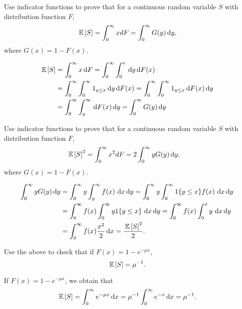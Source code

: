 \begin{question}
 Use indicator functions to prove that for  a continuous random
    variable $S$ with distribution function $F$, 
\begin{align*}
    \,\mathbb{E}\left[S\right] &= \int_0^\infty x dF  = \int_0^\infty G(y) \,\text{d}y,\\
\end{align*}
where $G(x) = 1 - F(x)$. 
\begin{solution}
\begin{equation*}
  \begin{split}
    \,\mathbb{E}\left[S\right] &= \int_0^\infty x \,\text{d}F  = \int_0^\infty \int_0^x \,\text{d}y \,\text{d}F(x) \\
    & = \int_0^\infty \int_0^\infty 1_{y\leq x} \,\text{d}y \,\text{d}F(x)   = \int_0^\infty \int_0^\infty 1_{y\leq x} \,\text{d}F(x) \,\text{d}y\\
    & = \int_0^\infty \int_y^\infty \,\text{d}F(x) \,\text{d}y = \int_0^\infty G(y) \,\text{d}y
  \end{split}
\end{equation*}
\end{solution}
\end{question}

\begin{question}
 Use indicator functions to prove that for  a continuous random
    variable $S$ with distribution function $F$, 
\begin{align*}
    \,\mathbb{E}\left[S\right]^2 &= \int_0^\infty x^2 dF  = 2 \int_0^\infty y G(y) \,\text{d}y,
\end{align*}
where $G(x) = 1 - F(x)$. 
\begin{solution}
  \begin{equation*}
    \begin{split}
\int_0^\infty y G(y) \,\text{d}y 
&=  \int_0^\infty y \int_y^\infty f(x)\, \,\text{d}x \,\text{d}y =  \int_0^\infty y \int_0^\infty 1\{y\leq x\}f(x)\, \,\text{d}x \,\text{d}y\\
&=  \int_0^\infty f(x) \int_0^\infty y 1\{y \leq x\}\, \,\text{d}x \,\text{d}y
=  \int_0^\infty f(x) \int_0^x y\, \,\text{d}x \,\text{d}y\\
&=  \int_0^\infty f(x) \frac{x^2}2 \,\text{d}x =\frac{\,\mathbb{E}\left[S\right]^2}2.
    \end{split}
  \end{equation*}
\end{solution}
\end{question}


\begin{question}
 Use the above to check that if $F(x) = 1 - e^{-\mu x}$,
\begin{equation*}
  \,\mathbb{E}\left[S\right] = \mu^{-1}.
\end{equation*}
\begin{solution}
If $F(x) = 1 - e^{-\mu x}$, we obtain that 
\begin{equation*}
  \,\mathbb{E}\left[S\right] = \int_0^\infty e^{-\mu x} \,\text{d}x =
  \mu^{-1}\int_0^\infty e^{-x} \,\text{d}x = \mu^{-1}.
\end{equation*}
\end{solution}
\end{question}



